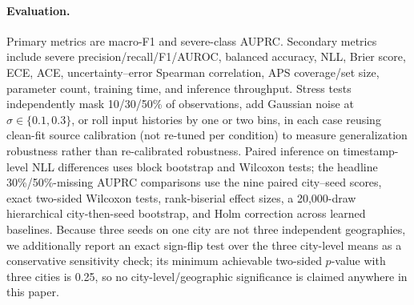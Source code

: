 \paragraph{Evaluation.} Primary metrics are macro-F1 and severe-class AUPRC. Secondary metrics
include severe precision/recall/F1/AUROC, balanced accuracy, NLL, Brier score, ECE, ACE,
uncertainty--error Spearman correlation, APS coverage/set size, parameter count, training time, and
inference throughput. Stress tests independently mask 10/30/50\% of observations, add Gaussian
noise at $\sigma\in\{0.1,0.3\}$, or roll input histories by one or two bins, in each case reusing
clean-fit source calibration (not re-tuned per condition) to measure generalization robustness
rather than re-calibrated robustness. Paired inference on timestamp-level NLL differences uses
block bootstrap and Wilcoxon tests; the headline 30\%/50\%-missing AUPRC comparisons use the nine
paired city--seed scores, exact two-sided Wilcoxon tests, rank-biserial effect sizes, a 20{,}000-draw
hierarchical city-then-seed bootstrap, and Holm correction across learned baselines. Because three
seeds on one city are not three independent geographies, we additionally report an exact sign-flip
test over the three city-level means as a conservative sensitivity check; its minimum achievable
two-sided $p$-value with three cities is 0.25, so no city-level/geographic significance is claimed
anywhere in this paper.
